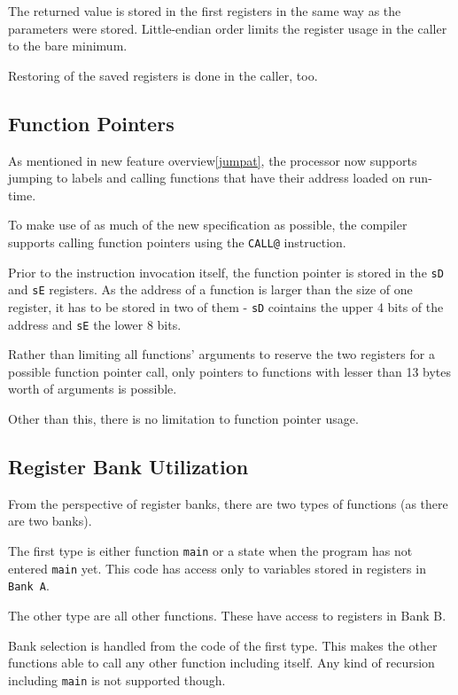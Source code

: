         The returned value is stored in the first registers in the same way as the parameters were stored. Little-endian order limits the register usage in the caller to the bare minimum.

        Restoring of the saved registers is done in the caller, too.

        \subsection{Function Pointers}

        As mentioned in new feature overview\ref{jumpat}, the processor now supports jumping to labels and calling functions that have their address loaded on run-time.

        To make use of as much of the new specification as possible, the compiler supports calling function pointers using the \texttt{CALL@} instruction.

        Prior to the instruction invocation itself, the function pointer is stored in the \texttt{sD} and \texttt{sE} registers. As the address of a function is larger than the size of one register, it has to be stored in two of them - \texttt{sD} cointains the upper 4 bits of the address and \texttt{sE} the lower 8 bits.

        Rather than limiting all functions' arguments to reserve the two registers for a possible function pointer call, only pointers to functions with lesser than 13 bytes worth of arguments is possible.

        Other than this, there is no limitation to function pointer usage.

        \subsection{Register Bank Utilization}

        From the perspective of register banks, there are two types of functions (as there are two banks). 

        The first type is either function \texttt{main} or a state when the program has not entered \texttt{main} yet. This code has access only to variables stored in registers in \texttt{Bank A}.

        The other type are all other functions. These have access to registers in Bank B.

        Bank selection is handled from the code of the first type. This makes the other functions able to call any other function including itself. Any kind of recursion including \texttt{main} is not supported though.

